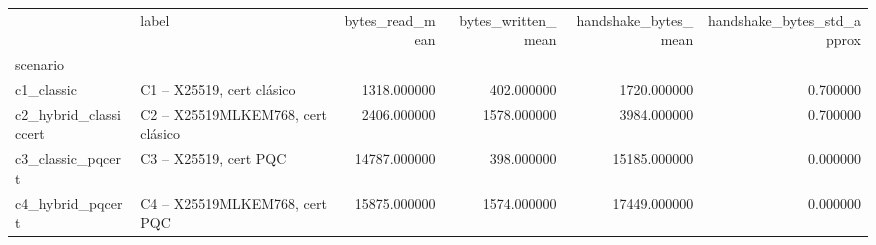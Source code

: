 \begin{tabular}{llrrrr}
\toprule
 & label & bytes_read_mean & bytes_written_mean & handshake_bytes_mean & handshake_bytes_std_approx \\
scenario &  &  &  &  &  \\
\midrule
c1_classic & C1 – X25519, cert clásico & 1318.000000 & 402.000000 & 1720.000000 & 0.700000 \\
c2_hybrid_classiccert & C2 – X25519MLKEM768, cert clásico & 2406.000000 & 1578.000000 & 3984.000000 & 0.700000 \\
c3_classic_pqcert & C3 – X25519, cert PQC & 14787.000000 & 398.000000 & 15185.000000 & 0.000000 \\
c4_hybrid_pqcert & C4 – X25519MLKEM768, cert PQC & 15875.000000 & 1574.000000 & 17449.000000 & 0.000000 \\
\bottomrule
\end{tabular}
